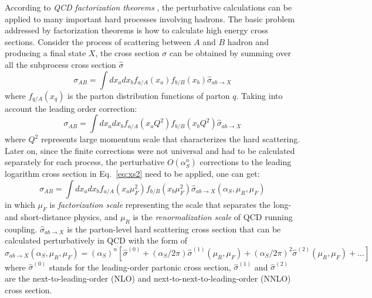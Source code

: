 According to \textit{QCD factorization theorems} \cite{Collins:1989gx}, the perturbative calculations can be applied to many important hard processes involving hadrons. 
The basic problem addressed by factorization theorems is how to calculate high energy cross sections.
Consider the process of scattering between $A$ and $B$ hadron and producing a final state $X$, the cross section $\sigma$ can be obtained 
by summing over all the subprocess cross section $\hat{\sigma}$ \cite{Stirling:1194745}
\begin{equation}
	\sigma_{AB} = \int dx_{a} dx_{b} f_{a/A}\left(x_{a}\right) f_{b/B}\left(x_{b}\right) \hat{\sigma}_{ab\rightarrow X}
\end{equation}
where $f_{q/A}\left(x_{q}\right)$ is the parton distribution functions of parton $q$.
Taking into account the leading order correction:
\begin{equation} \label{eq:xs2}
	\sigma_{AB} = \int dx_{a} dx_{b} f_{a/A}\left(x_{a}Q^{2}\right) f_{b/B}\left(x_{b}Q^{2}\right) \hat{\sigma}_{ab\rightarrow X}
\end{equation}
where $Q^{2}$ represents large momentum scale that characterizes the hard scattering.
Later on, since the finite corrections were not universal and had to be calculated separately for each process,
the perturbative $O\left(\alpha_{S}^{n}\right)$ corrections to the leading logarithm cross section in Eq.~\ref{eq:xs2}
need to be applied, one can get:
\begin{equation}
	\sigma_{AB} = \int dx_{a} dx_{b} f_{a/A}\left(x_{a}\mu_{F}^{2}\right) f_{b/B}\left(x_{b}\mu_{F}^{2}\right) \hat{\sigma}_{ab\rightarrow X}\left(\alpha_{S},\mu_{R},\mu_{F}\right)
\end{equation}
in which $\mu_{F}$ is \textit{factorization scale} representing the scale that separates the long- and short-distance physics,
and $\mu_{R}$ is the \textit{renormalization scale} of QCD running coupling.
$\hat{\sigma}_{ab\rightarrow X}$ is the parton-level hard scattering cross section that can be calculated perturbatively in QCD with the form of
\begin{equation} \label{eq:xs3}
	\hat{\sigma}_{ab\rightarrow X}\left(\alpha_{S},\mu_{R},\mu_{F}\right) 
		= \left(\alpha_{S}\right)^{n} \left[ \hat{\sigma}^{(0)}
		+ \left(\alpha_{S}/2\pi\right) \hat{\sigma}^{(1)}\left(\mu_{R},\mu_{F}\right)
		+ \left(\alpha_{S}/2\pi\right)^{2} \hat{\sigma}^{(2)}\left(\mu_{R},\mu_{F}\right)
		+ ... \right]
\end{equation}
where $\hat{\sigma}^{(0)}$ stands for the leading-order partonic cross section,
$\hat{\sigma}^{(1)}$ and $\hat{\sigma}^{(2)}$ are the next-to-leading-order (NLO) and
next-to-next-to-leading-order (NNLO) cross section.

